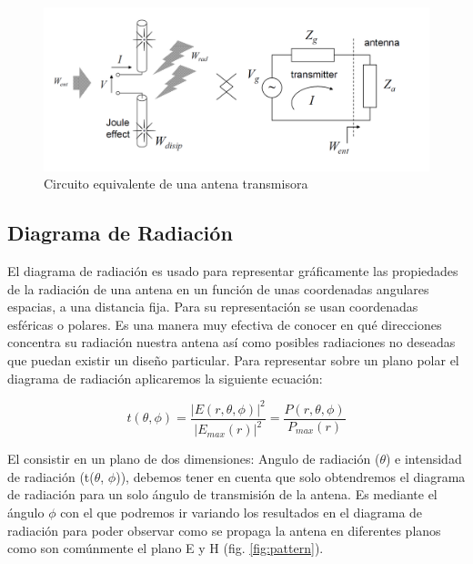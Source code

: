 \begin{figure}[h]
    \centering
        \includegraphics[width=15cm]{archivos/impedancia}
        \caption{Circuito equivalente de una antena transmisora}
        \label{fig:impedancia}
\end{figure}

\subsection{Diagrama de Radiación}

\par El diagrama de radiación es usado para representar gráficamente las propiedades de la radiación de una antena en un función de unas coordenadas angulares espacias, a una distancia fija. Para su representación se usan coordenadas esféricas o polares. Es una manera muy efectiva de conocer en qué direcciones concentra su radiación nuestra antena así como posibles radiaciones no deseadas que puedan existir un diseño particular. Para representar sobre un plano polar el diagrama de radiación aplicaremos la siguiente ecuación:

\begin{equation}
	t(\theta, \phi )=\frac{\left | E(r, \theta, \phi ) \right |^2}{\left | E_{max}(r) \right |^2}= \frac{P(r,\theta ,\phi)}{P_{max}(r)}
	\label{eq:diagramarad}
\end{equation}

\par El consistir en un plano de dos dimensiones: Angulo de radiación ($\theta$) e intensidad de radiación (t($\theta $, $\phi $)), debemos tener en cuenta que solo obtendremos el diagrama de radiación para un solo ángulo de transmisión de la antena. Es mediante el ángulo $\phi $ con el que podremos ir variando los resultados en el diagrama de radiación para poder observar como se propaga la antena en diferentes planos como son comúnmente el plano E y H (fig. \ref{fig:pattern}).


